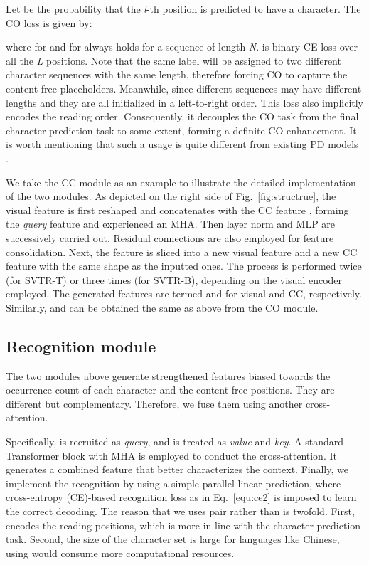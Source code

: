 \documentclass[10pt,journal,compsoc]{IEEEtran}
\begin{document}
Let  be the probability that the \emph{l}-th position is predicted to have a character. The CO loss  is given by:


\noindent where  for  and  for  always holds for a sequence of length \emph{N}.  is binary CE loss over all the \emph{L} positions. Note that the same label will be assigned to two different character sequences with the same length, therefore forcing CO to capture the content-free placeholders. Meanwhile, since different sequences may have different lengths and they are all initialized in a left-to-right order. This loss also implicitly encodes the reading order. Consequently, it decouples the CO task from the final character prediction task to some extent, forming a definite CO enhancement. It is worth mentioning that such a usage is quite different from existing PD models \cite{yu2020srn,fang2021abinet,Wang_2021_visionlan}.

We take the CC module as an example to illustrate the detailed implementation of the two modules. As depicted on the right side of Fig.~\ref{fig:structrue}, the visual feature  is first reshaped and concatenates with the CC feature , forming the \emph{query} feature and experienced an MHA. Then layer norm and MLP are successively carried out. Residual connections are also employed for feature consolidation. Next, the feature is sliced into a new visual feature and a new CC feature with the same shape as the inputted ones. The process is performed twice (for SVTR-T) or three times (for SVTR-B), depending on the visual encoder employed. The generated features are termed  and  for visual and CC, respectively. Similarly,  and  can be obtained the same as above from the CO module.

\subsection{Recognition module}
The two modules above generate strengthened features biased towards the occurrence count of each character and the content-free positions. They are different but complementary. Therefore, we fuse them using another cross-attention.

Specifically,  is recruited as \emph{query}, and  is treated as \emph{value} and \emph{key}. A standard Transformer block with MHA is employed to conduct the cross-attention. It generates a combined feature that better characterizes the context. Finally, we implement the recognition by using a simple parallel linear prediction, where cross-entropy (CE)-based recognition loss as in Eq.~\ref{equ:ce2} is imposed to learn the correct decoding. The reason that we uses  pair rather than  is twofold. First,  encodes the reading positions, which is more in line with the character prediction task. Second, the size of the character set  is large for languages like Chinese, using  would consume more computational resources. 
\end{document}
